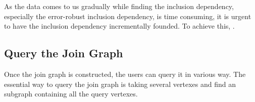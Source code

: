 As the data comes to us gradually while finding the inclusion dependency, especially the error-robust inclusion dependency, is time consuming, it is urgent to have the inclusion dependency incrementally founded. To achieve this, .  



\subsection{Query the Join Graph}\label{subsec:query}

Once the join graph is constructed, the users can query it in various way. The essential way to query the join graph is taking several vertexes and find an subgraph containing all the query vertexes.

